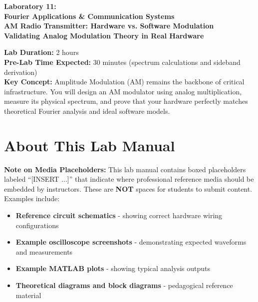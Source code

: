 \documentclass[11pt,letterpaper]{article}
\begin{document}
\begin{center}
\huge{\bf Laboratory 11:}\\
\vspace{0.2in}
\Large{\bf Fourier Applications \& Communication Systems}\\
\Large{\bf AM Radio Transmitter: Hardware vs. Software Modulation}\\
\vspace{0.2in}
\normalsize{\bf Validating Analog Modulation Theory in Real Hardware}
\end{center}

\vspace{0.3in}
\noindent
\textbf{Lab Duration:} 2 hours\\
\textbf{Pre-Lab Time Expected:} 30 minutes (spectrum calculations and sideband derivation)\\
\textbf{Key Concept:} Amplitude Modulation (AM) remains the backbone of critical infrastructure. You will design an AM modulator using analog multiplication, measure its physical spectrum, and prove that your hardware perfectly matches theoretical Fourier analysis and ideal software models.

\tableofcontents
\clearpage

\section*{About This Lab Manual}

\textbf{Note on Media Placeholders:} This lab manual contains boxed placeholders labeled ``[INSERT ...]'' that indicate where professional reference media should be embedded by instructors. These are \textbf{NOT} spaces for students to submit content. Examples include:

\begin{itemize}
    \item \textbf{Reference circuit schematics} - showing correct hardware wiring configurations
    \item \textbf{Example oscilloscope screenshots} - demonstrating expected waveforms and measurements
    \item \textbf{Example MATLAB plots} - showing typical analysis outputs
    \item \textbf{Theoretical diagrams and block diagrams} - pedagogical reference material
\end{itemize}
\end{document}

